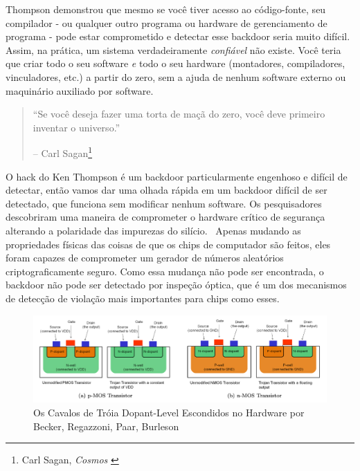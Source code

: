 Thompson demonstrou que mesmo se você tiver acesso ao código-fonte, seu compilador - ou qualquer outro programa ou hardware de gerenciamento de programa - pode estar comprometido e detectar esse backdoor seria muito difícil. Assim, na prática, um sistema verdadeiramente \textit{confiável} não existe. Você teria que criar todo o seu software \textit{e} todo o seu hardware (montadores, compiladores, vinculadores, etc.) a partir do zero, sem a ajuda de nenhum software externo ou maquinário auxiliado por software.

\begin{quotation}\begin{samepage}
\enquote{Se você deseja fazer uma torta de maçã do zero, você deve primeiro inventar o universo.}
\begin{flushright} -- Carl Sagan\footnote{Carl Sagan, \textit{Cosmos} \cite{cosmos}}
\end{flushright}\end{samepage}\end{quotation}

O hack do Ken Thompson é um backdoor particularmente engenhoso e difícil de detectar, então vamos dar uma olhada rápida em um backdoor difícil de ser detectado, que funciona sem modificar nenhum software. Os pesquisadores descobriram uma maneira de comprometer o hardware crítico de segurança alterando a polaridade das impurezas do silício.~\cite{becker2013stealthy} Apenas mudando as propriedades físicas das coisas de que os chips de computador são feitos, eles foram capazes de comprometer um gerador de números aleatórios criptograficamente seguro. Como essa mudança não pode ser encontrada, o backdoor não pode ser detectado por inspeção óptica, que é um dos mecanismos de detecção de violação mais importantes para chips como esses.

\begin{figure}
  \includegraphics{assets/images/stealthy-hardware-trojan.png}
  \caption{Os Cavalos de Tróia Dopant-Level Escondidos no Hardware por Becker, Regazzoni, Paar, Burleson}
  \label{fig:stealthy-hardware-trojan}
\end{figure}

